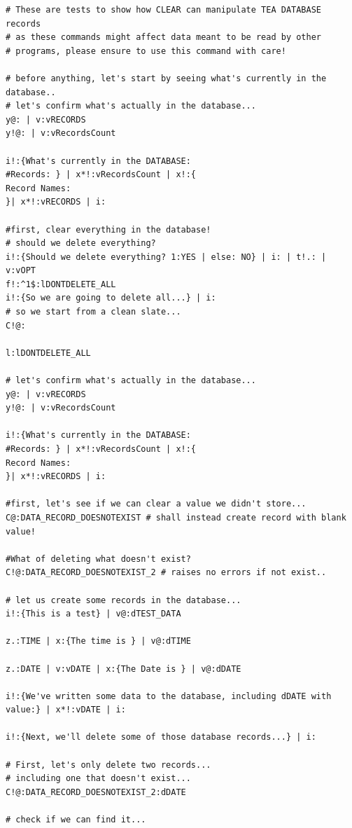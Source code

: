 \documentclass[a4paper, 18pt]{book} %
\begin{document}
\vspace{2em}

  \begin{tcolorbox}[teaterminalstyle, title=C: TEA DATABASE management TEST suite, breakable]
  \begin{lstlisting}[language=TEA,breaklines=true,]
# These are tests to show how CLEAR can manipulate TEA DATABASE records
# as these commands might affect data meant to be read by other
# programs, please ensure to use this command with care!

# before anything, let's start by seeing what's currently in the database..
# let's confirm what's actually in the database...
y@: | v:vRECORDS
y!@: | v:vRecordsCount

i!:{What's currently in the DATABASE:
#Records: } | x*!:vRecordsCount | x!:{
Record Names:
}| x*!:vRECORDS | i:

#first, clear everything in the database!
# should we delete everything?
i!:{Should we delete everything? 1:YES | else: NO} | i: | t!.: | v:vOPT
f!:^1$:lDONTDELETE_ALL
i!:{So we are going to delete all...} | i:
# so we start from a clean slate...
C!@:

l:lDONTDELETE_ALL

# let's confirm what's actually in the database...
y@: | v:vRECORDS
y!@: | v:vRecordsCount

i!:{What's currently in the DATABASE:
#Records: } | x*!:vRecordsCount | x!:{
Record Names:
}| x*!:vRECORDS | i:

#first, let's see if we can clear a value we didn't store...
C@:DATA_RECORD_DOESNOTEXIST # shall instead create record with blank value!

#What of deleting what doesn't exist?
C!@:DATA_RECORD_DOESNOTEXIST_2 # raises no errors if not exist..

# let us create some records in the database...
i!:{This is a test} | v@:dTEST_DATA

z.:TIME | x:{The time is } | v@:dTIME

z.:DATE | v:vDATE | x:{The Date is } | v@:dDATE

i!:{We've written some data to the database, including dDATE with value:} | x*!:vDATE | i:

i!:{Next, we'll delete some of those database records...} | i:

# First, let's only delete two records...
# including one that doesn't exist...
C!@:DATA_RECORD_DOESNOTEXIST_2:dDATE

# check if we can find it...


\end{lstlisting}
\end{tcolorbox}
\end{document}
